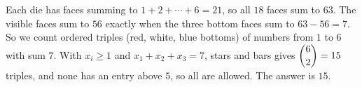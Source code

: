Each die has faces summing to $1+2+\cdots+6=21$, so all $18$ faces sum to $63$. The visible faces sum to $56$ exactly when the three bottom faces sum to $63-56=7$. So we count ordered triples (red, white, blue bottoms) of numbers from $1$ to $6$ with sum $7$. With $x_i\ge1$ and $x_1+x_2+x_3=7$, stars and bars gives $\dbinom{6}{2}=15$ triples, and none has an entry above $5$, so all are allowed. The answer is $\boxed{15}$.
